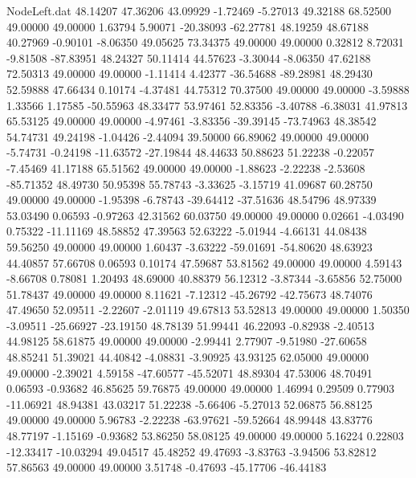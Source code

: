 \begin{filecontents}{NodeLeft.dat}
  48.14207   47.36206   43.09929    -1.72469   -5.27013   49.32188   68.52500   49.00000   49.00000    1.63794    5.90071  -20.38093  -62.27781
  48.19259   48.67188   40.27969    -0.90101   -8.06350   49.05625   73.34375   49.00000   49.00000    0.32812    8.72031   -9.81508  -87.83951
  48.24327   50.11414   44.57623    -3.30044   -8.06350   47.62188   72.50313   49.00000   49.00000   -1.11414    4.42377  -36.54688  -89.28981
  48.29430   52.59888   47.66434     0.10174   -4.37481   44.75312   70.37500   49.00000   49.00000   -3.59888    1.33566    1.17585  -50.55963
  48.33477   53.97461   52.83356    -3.40788   -6.38031   41.97813   65.53125   49.00000   49.00000   -4.97461   -3.83356  -39.39145  -73.74963
  48.38542   54.74731   49.24198    -1.04426   -2.44094   39.50000   66.89062   49.00000   49.00000   -5.74731   -0.24198  -11.63572  -27.19844
  48.44633   50.88623   51.22238    -0.22057   -7.45469   41.17188   65.51562   49.00000   49.00000   -1.88623   -2.22238   -2.53608  -85.71352
  48.49730   50.95398   55.78743    -3.33625   -3.15719   41.09687   60.28750   49.00000   49.00000   -1.95398   -6.78743  -39.64412  -37.51636
  48.54796   48.97339   53.03490     0.06593   -0.97263   42.31562   60.03750   49.00000   49.00000    0.02661   -4.03490    0.75322  -11.11169
  48.58852   47.39563   52.63222    -5.01944   -4.66131   44.08438   59.56250   49.00000   49.00000    1.60437   -3.63222  -59.01691  -54.80620
  48.63923   44.40857   57.66708     0.06593    0.10174   47.59687   53.81562   49.00000   49.00000    4.59143   -8.66708    0.78081    1.20493
  48.69000   40.88379   56.12312    -3.87344   -3.65856   52.75000   51.78437   49.00000   49.00000    8.11621   -7.12312  -45.26792  -42.75673
  48.74076   47.49650   52.09511    -2.22607   -2.01119   49.67813   53.52813   49.00000   49.00000    1.50350   -3.09511  -25.66927  -23.19150
  48.78139   51.99441   46.22093    -0.82938   -2.40513   44.98125   58.61875   49.00000   49.00000   -2.99441    2.77907   -9.51980  -27.60658
  48.85241   51.39021   44.40842    -4.08831   -3.90925   43.93125   62.05000   49.00000   49.00000   -2.39021    4.59158  -47.60577  -45.52071
  48.89304   47.53006   48.70491     0.06593   -0.93682   46.85625   59.76875   49.00000   49.00000    1.46994    0.29509    0.77903  -11.06921
  48.94381   43.03217   51.22238    -5.66406   -5.27013   52.06875   56.88125   49.00000   49.00000    5.96783   -2.22238  -63.97621  -59.52664
  48.99448   43.83776   48.77197    -1.15169   -0.93682   53.86250   58.08125   49.00000   49.00000    5.16224    0.22803  -12.33417  -10.03294
  49.04517   45.48252   49.47693    -3.83763   -3.94506   53.82812   57.86563   49.00000   49.00000    3.51748   -0.47693  -45.17706  -46.44183

\end{filecontents}
